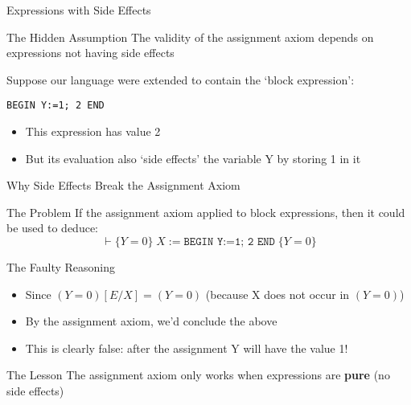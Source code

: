 \begin{frame}{Expressions with Side Effects}
    \begin{block}{The Hidden Assumption}
        The validity of the assignment axiom depends on expressions not having side effects
    \end{block}
    
    \begin{example}
        Suppose our language were extended to contain the `block expression':
        \begin{center}
            \texttt{BEGIN Y:=1; 2 END}
        \end{center}
        \begin{itemize}
            \item This expression has value 2
            \item But its evaluation also `side effects' the variable Y by storing 1 in it
        \end{itemize}
    \end{example}
\end{frame}

\begin{frame}{Why Side Effects Break the Assignment Axiom}
    \begin{block}{The Problem}
        If the assignment axiom applied to block expressions, then it could be used to deduce:
        \[ \vdash \{Y=0\} \; X := \texttt{BEGIN Y:=1; 2 END} \; \{Y=0\} \]
    \end{block}
    
    \begin{block}{The Faulty Reasoning}
        \begin{itemize}
            \item Since $(Y=0)[E/X] = (Y=0)$ (because X does not occur in $(Y=0)$)
            \item By the assignment axiom, we'd conclude the above
            \item This is clearly false: after the assignment Y will have the value 1!
        \end{itemize}
    \end{block}
    
    \begin{alertblock}{The Lesson}
        The assignment axiom only works when expressions are \textbf{pure} (no side effects)
    \end{alertblock}
\end{frame}

